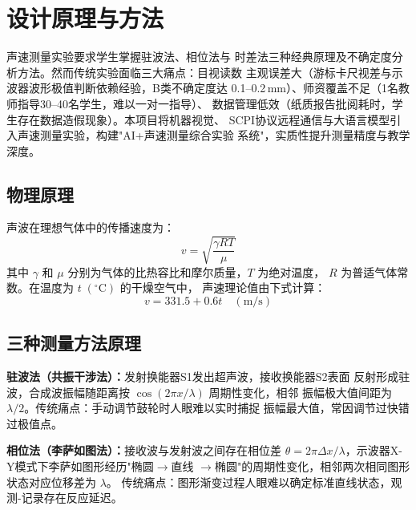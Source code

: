 

\section{设计原理与方法}

声速测量实验要求学生掌握驻波法、相位法与
时差法三种经典原理及不确定度分析方法。然而传统实验面临三大痛点：目视读数
主观误差大（游标卡尺视差与示波器波形极值判断依赖经验，B类不确定度达
0.1--0.2\,mm）、师资覆盖不足（1名教师指导30--40名学生，难以一对一指导）、
数据管理低效（纸质报告批阅耗时，学生存在数据造假现象）。本项目将机器视觉、
SCPI协议远程通信与大语言模型引入声速测量实验，构建"AI+声速测量综合实验
系统"，实质性提升测量精度与教学深度。

\subsection{物理原理}

声波在理想气体中的传播速度为：
\begin{equation}
    v = \sqrt{\frac{\gamma RT}{\mu}}
    \label{eq:sound_speed}
\end{equation}
其中 $\gamma$ 和 $\mu$ 分别为气体的比热容比和摩尔质量，$T$ 为绝对温度，
$R$ 为普适气体常数。在温度为 $t\;({}^\circ\mathrm{C})$ 的干燥空气中，
声速理论值由下式计算：
\begin{equation}
    v = 331.5 + 0.6t \quad (\mathrm{m/s})
    \label{eq:sound_speed_air}
\end{equation}

\subsection{三种测量方法原理}

\textbf{驻波法（共振干涉法）：}发射换能器S1发出超声波，接收换能器S2表面
反射形成驻波，合成波振幅随距离按 $\cos(2\pi x/\lambda)$ 周期性变化，相邻
振幅极大值间距为 $\lambda/2$。传统痛点：手动调节鼓轮时人眼难以实时捕捉
振幅最大值，常因调节过快错过极值点。

\textbf{相位法（李萨如图法）：}接收波与发射波之间存在相位差
$\theta=2\pi\Delta x/\lambda$，示波器X-Y模式下李萨如图形经历"椭圆$\to$直线
$\to$椭圆"的周期性变化，相邻两次相同图形状态对应位移差为 $\lambda$。
传统痛点：图形渐变过程人眼难以确定标准直线状态，观测-记录存在反应延迟。

